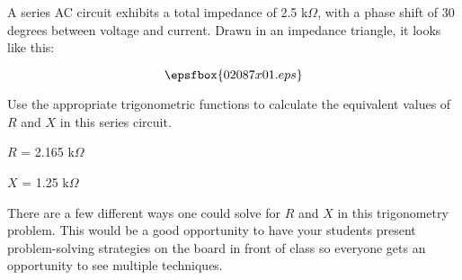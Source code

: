 

A series AC circuit exhibits a total impedance of 2.5 k$\Omega$, with a phase shift of 30 degrees between voltage and current.  Drawn in an impedance triangle, it looks like this:

$$\epsfbox{02087x01.eps}$$

Use the appropriate trigonometric functions to calculate the equivalent values of $R$ and $X$ in this series circuit.







$R$ = 2.165 k$\Omega$

$X$ = 1.25 k$\Omega$







There are a few different ways one could solve for $R$ and $X$ in this trigonometry problem.  This would be a good opportunity to have your students present problem-solving strategies on the board in front of class so everyone gets an opportunity to see multiple techniques.




